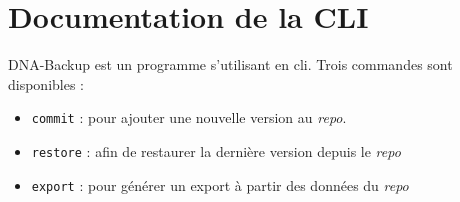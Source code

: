 \documentclass[a4paper]{report}
\begin{document}


\appendix



\chapter{Documentation de la CLI}

DNA-Backup est un programme s'utilisant en \ac{cli}.
Trois commandes sont disponibles :

\begin{itemize}
  \item \verb|commit| : pour ajouter une nouvelle version au \emph{repo}.
  \item \verb|restore| : afin de restaurer la dernière version depuis le \emph{repo}
  \item \verb|export| : pour générer un export à partir des données du \emph{repo}
\end{itemize}
\end{document}
